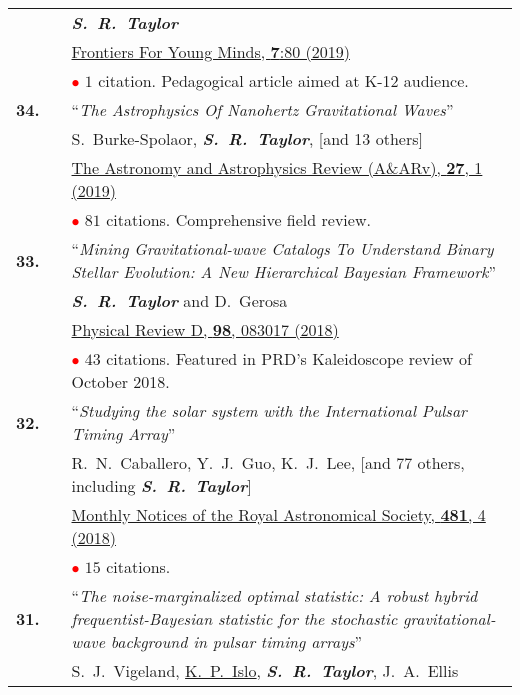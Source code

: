 \documentclass[11pt,letterpaper,sans]{moderncv}
\begin{document}
{\begin{longtable}{rp{0.3cm}p{15.8cm}}
&&\textit{\textbf{S.~R.~Taylor}}\\
&& \href{https://kids.frontiersin.org/article/10.3389/frym.2019.00080}{{\color{color1} Frontiers For Young Minds, \textbf{7}:80 (2019)}} \\
&& \textcolor{red}{$\bullet$} $1$ citation. Pedagogical article aimed at K-12 audience. \vspace{0.09cm}\\
\textbf{34.} & & ``\textit{The Astrophysics Of Nanohertz Gravitational Waves}'' \\ 
&&S.~Burke-Spolaor, \textit{\textbf{S.~R.~Taylor}}, [and 13 others] \\
&& \href{https://arxiv.org/abs/1811.08826}{{\color{color1} The Astronomy and Astrophysics Review (A\&ARv), \textbf{27}, 1 (2019)}} \\
&& \textcolor{red}{$\bullet$} $81$ citations. Comprehensive field review. \vspace{0.09cm}\\
\textbf{33.} & & ``\textit{Mining Gravitational-wave Catalogs To Understand Binary Stellar Evolution: A New Hierarchical Bayesian Framework}'' \\ 
&&\textit{\textbf{S.~R.~Taylor}} and D.~Gerosa \\
&& \href{https://journals.aps.org/prd/abstract/10.1103/PhysRevD.98.083017}{{\color{color1} Physical Review D, \textbf{98}, 083017 (2018)}} \\
&& \textcolor{red}{$\bullet$} $43$ citations. Featured in PRD's Kaleidoscope review of October 2018. \vspace{0.09cm}\\
\textbf{32.} & & ``\textit{Studying the solar system with the International Pulsar Timing Array}'' \\ 
&&R.~N.~Caballero, Y.~J.~Guo, K.~J.~Lee, [and 77 others, including  \textit{\textbf{S.~R.~Taylor}}]\\
&& \href{https://academic.oup.com/mnras/article-abstract/481/4/5501/5113478?redirectedFrom=fulltext}{{\color{color1} Monthly Notices of the Royal Astronomical Society, \textbf{481}, 4 (2018)}}  \\
&& \textcolor{red}{$\bullet$} $15$ citations. \vspace{0.09cm}\\
\textbf{31.} & & ``\textit{The noise-marginalized optimal statistic: A robust hybrid frequentist-Bayesian statistic for the stochastic gravitational-wave background in pulsar timing arrays}'' \\ 
&&S.~J.~Vigeland, \underline{K.~P.~Islo}, \textit{\textbf{S.~R.~Taylor}}, J.~A.~Ellis \\

\end{longtable}}
\end{document}
